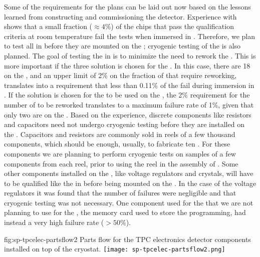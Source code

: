 Some of the requirements for the  plans can
be laid out now based on the lessons learned
from constructing and commissioning the 
detector. Experience with  shows that a small fraction
($\approx4$\%) of the  chips that pass the
qualification criteria at room temperature fail the tests
when immersed in \lntwo. Therefore, we plan to test all  in \lntwo
before they are mounted on the ; 
cryogenic testing of the  is also planned. The goal of testing 
the  in \lntwo is to minimize the need
to rework the . This is more important if 
the three  solution is chosen for the
. In this case, there are 18  on the
, and an upper limit of 2\% on the fraction of
 that require reworking, translates into a requirement 
that less than 0.11\% of the  fail during immersion in \lntwo.
If the  solution is chosen for the 
to be used on the , the 2\% requirement for the
number of  to be reworked translates to a 
maximum failure rate of 1\%, given that only two
 are on the . Based on the 
experience, discrete components like resistors and capacitors
need not undergo cryogenic testing before they are installed
on the . Capacitors and resistors are commonly
sold in reels of a few thousand components, which
should be enough, usually, to fabricate ten
. For these components we are planning to
perform cryogenic tests on samples of a few components
from each reel, prior to using the reel in the assembly of
. Some other components installed on
the , like voltage regulators and crystals, 
will have to be qualified like the 
in \lntwo before being mounted on the . In the
case of the voltage regulators it was found that the number
of failures were negligible and that cryogenic testing was
not necessary. One component used for the 
that we are not planning to use for the  ,
the memory card used to store the  programming,
had instead a very high failure rate ($>50$\%).

\begin{dunefigure}
{fig:sp-tpcelec-partsflow2}
{Parts flow for the TPC electronics detector components installed on top of the cryostat.}
\texttt{[image: sp-tpcelec-partsflow2.png]}
\end{dunefigure}

